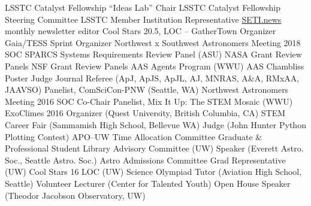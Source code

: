\documentclass{article}
\begin{document}
\begin{llist}
{\sc LSSTC Catalyst Fellowship ``Ideas Lab'' Chair}
{\sc LSSTC Catalyst Fellowship Steering Committee}
{\sc LSSTC Member Institution Representative}
{\sc \href{http://seti.news}{\color{NavyBlue}SETI.news} monthly newsletter editor}
{\sc Cool Stars 20.5, LOC -- GatherTown Organizer}
{\sc Gaia/TESS Sprint Organizer}
{\sc Northwest x Southwest Astronomers Meeting 2018 SOC} 
{\sc SPARCS Systems Requirements Review Panel} (ASU) 
{\sc NASA Grant Review Panels}\location{}
{\sc NSF Grant Review Panels}\location{}
{\sc AAS Agents Program} (WWU) \location{}
{\sc AAS Chambliss Poster Judge}\location{}
{\sc Journal Referee (ApJ, ApJS, ApJL, AJ, MNRAS, A\&A, RMxAA, JAAVSO)}\location{}
{\sc Panelist}, ComSciCon-PNW (Seattle, WA) 
{\sc Northwest Astronomers Meeting 2016 SOC Co-Chair} 
{\sc Panelist}, Mix It Up: The STEM Mosaic (WWU) 
{\sc ExoClimes 2016 Organizer} (Quest University, British Columbia, CA) 
{\sc STEM Career Fair} (Sammamish High School, Bellevue WA) 
{\sc Judge (John Hunter Python Plotting Contest)} 
{\sc APO--UW Time Allocation Committee } 
{\sc Graduate \& Professional Student Library Advisory Committee (UW)} 
{\sc Speaker (Everett Astro. Soc.,  Seattle Astro. Soc.)}
{\sc Astro Admissions Committee Grad Representative (UW)} 
{\sc Cool Stars 16 LOC (UW)} 
{\sc Science Olympiad Tutor (Aviation High School, Seattle)} 
{\sc Volunteer Lecturer (Center for Talented Youth)} 
{\sc Open House Speaker (Theodor Jacobson Observatory, UW)} 













\end{llist}
\end{document}
